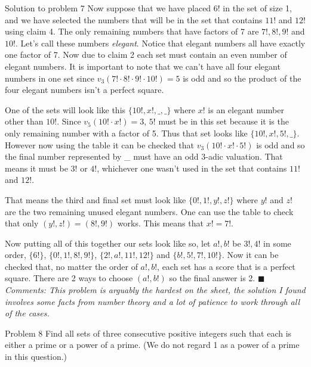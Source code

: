 \documentclass{article}
\begin{document}
\begin{solution}{Solution to problem 7}
Now suppose that we have placed $6!$ in the set of size 1, and we have
selected the numbers that will be in the set that contains $11!$ and
$12!$ using claim 4. The only remaining numbers that have factors of 7
are $7!, 8!, 9!$ and $10!$. Let's call these numbers \textit{elegant}.
Notice that elegant numbers all have exactly one factor of 7.
Now due to claim 2 each set must contain an even number of elegant numbers.
It is important to note that we can't have all four elegant numbers in one
set since $v_3(7!\cdot 8!\cdot 9!\cdot 10!) = 5$ is odd and so the product
of the four elegant numbers isn't a perfect square.
\vspace{0.2cm}

One of the sets will look like this $\{ 10!, x!, \_, \_ \}$ where $x!$ is
an elegant number other than $10!$. Since $v_5(10!\cdot x!) = 3$, $5!$ must
be in this set because it is the only remaining number with a factor of 5.
Thus that set looks like $\{ 10!, x!, 5!, \_ \}$. However now using the
table it can be checked that $v_3(10!\cdot x!\cdot 5!)$ is odd and so the
final number represented by \_ must have an odd 3-adic valuation. That
means it must be $3!$ or $4!$, whichever one wasn't used in the set
that contains $11!$ and $12!$. \vspace{0.2cm}

That means the third and final set must look like $\{ 0!, 1!, y!, z!\}$
where $y!$ and $z!$ are the two remaining unused elegant numbers.
One can use the table to check that only $(y!, z!) = (8!, 9!)$ works.
This means that $x! = 7!$.
\vspace{0.2cm}


Now putting all of this together our sets look like so, let $a!, b!$ be
$3!, 4!$ in some order,
$\{6!\}$, $\{0!,1!,8!,9!\}$, $\{2!, a!, 11!, 12!\}$ and
$\{b!, 5!, 7!, 10!\}$. Now it can be checked that, no matter the
order of $a!, b!$, each set has a score that is a perfect square. There
are 2 ways to choose $(a!, b!)$ so the final answer is 2. $\blacksquare$
\\

\textit{Comments: This problem is arguably the hardest on the sheet,
the solution I found involves some facts from number theory and a lot of
patience to work through all of the cases.}
\end{solution}
\vspace{0.5cm}

\newpage
\begin{problem}{Problem 8}
Find all sets of three consecutive positive integers such that each is either a prime or a power of a prime.
(We do not regard 1 as a power of a prime in this question.)
\end{problem}
\end{document}
